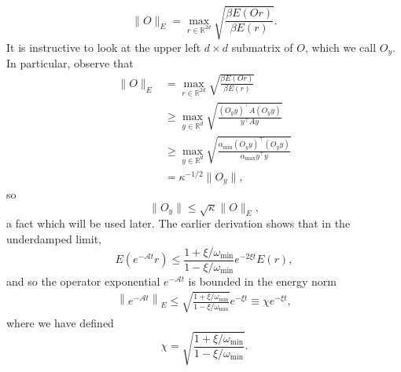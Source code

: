 \documentclass[prx,onecolumn,floatfix,longbibliography,notitlepage, nofootinbib,12pt]{revtex4-2}
\renewcommand{\geq}{\geqslant}
\renewcommand{\leq}{\leqslant}
\begin{document}
\begin{appendix}
\begin{equation}
    \|O\|_E = \max_{r\in \mathbb{R}^{2d}} \sqrt{\frac{\beta E(Or)}{\beta E(r)}}.
\end{equation}
It is instructive to look at the upper left $d \times d$ submatrix of $O$, which we call $O_{y}$. In particular, observe that
\begin{align}
     \|O\|_E &= \max_{r\in \mathbb{R}^{2d}} \sqrt{\frac{\beta E(Or)}{\beta E(r)}} \\
     & \geq \max_{y \in \mathbb{R}^{d}}\sqrt{\frac{(O_{y}y)^\intercal A (O_{y}y)}{y^\intercal A y}} \\
     & \geq 
      \max_{y \in \mathbb{R}^{d}}\sqrt{\frac{\alpha_\text{min}(O_{y}y)^\intercal (O_{y}y)}{\alpha_\text{max}y^\intercal  y}} \\
      & = \kappa^{-1/2} \|O_{y}\|,
\end{align}
so
\begin{equation}
    \|O_y\| \leq \sqrt{\kappa}\|O\|_E,
\end{equation}
a fact which will be used later. The earlier derivation shows that in the underdamped limit,
\begin{equation}
    E\left(e^{-\mathcal{A} t} r \right) \leq \frac{1+\xi/\omega_\text{min}}{1-\xi/\omega_\text{min}} e^{-2 \xi t} E(r),
\end{equation}
and so the operator exponential $e^{-\mathcal{A} t}$ is bounded in the energy norm
\begin{align}
    \left\|e^{-\mathcal{A} t}\right\|_E\leq  \sqrt{\frac{1+\xi/\omega_\text{min}}{1-\xi/\omega_\text{min}}}e^{- \xi t} \equiv \chi e^{-\xi t},
\end{align}
where we have defined
\begin{equation}
    \chi = \sqrt{\frac{1+\xi/\omega_\text{min}}{1-\xi/\omega_\text{min}}}.
\end{equation}


\end{appendix}
\end{document}
